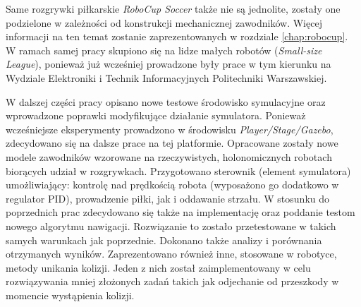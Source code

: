 Same rozgrywki piłkarskie \emph{RoboCup Soccer} także nie są jednolite, zostały one podzielone w zależności od konstrukcji mechanicznej zawodników. Więcej informacji na ten temat zostanie zaprezentowanych w rozdziale
\ref{chap:robocup}. W ramach samej pracy skupiono się na lidze małych robotów (\emph{Small-size League}), ponieważ już wcześniej prowadzone były prace w tym kierunku na Wydziale Elektroniki i 
Technik Informacyjnych Politechniki Warszawskiej.

W dalszej części pracy opisano nowe testowe środowisko symulacyjne oraz wprowadzone poprawki modyfikujące działanie symulatora.
Ponieważ wcześniejsze eksperymenty prowadzono w środowisku \emph{Player/Stage/Gazebo}, zdecydowano się na dalsze prace na tej platformie.
Opracowane zostały nowe modele zawodników wzorowane na rzeczywistych, holonomicznych robotach
biorących udział w rozgrywkach. Przygotowano sterownik (element symulatora) umożliwiający: kontrolę nad prędkością robota (wyposażono go dodatkowo w regulator PID), prowadzenie piłki, jak i oddawanie strzału.
 W stosunku do poprzednich prac zdecydowano się także na implementację oraz poddanie testom nowego algorytmu nawigacji.  Rozwiązanie to zostało przetestowane w takich samych warunkach 
jak poprzednie. Dokonano także analizy i porównania otrzymanych wyników. Zaprezentowano również inne, stosowane w robotyce, metody unikania kolizji. Jeden z nich został zaimplementowany w celu
rozwiązywania mniej złożonych zadań takich jak odjechanie od przeszkody w momencie wystąpienia kolizji.

